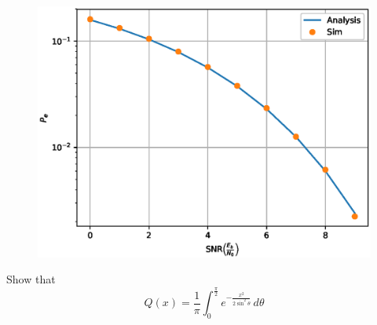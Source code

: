 \documentclass[journal,12pt,twocolumn]{IEEEtran}
\begin{document}
\begin{figure}[!h]
\centering
\includegraphics[width=\columnwidth]{./figs/bpsk_ber.eps}
\caption{}
\label{fig:bpsk_ber}
\end{figure}

\begin{problem}
Show that
\begin{equation}
Q(x) = \frac{1}{\pi}\int^{\frac{\pi}{2}}_{0}e^{-\frac{x^2}{2\sin^2 \theta}}\,d\theta
\end{equation}
\end{problem}
\end{document}
